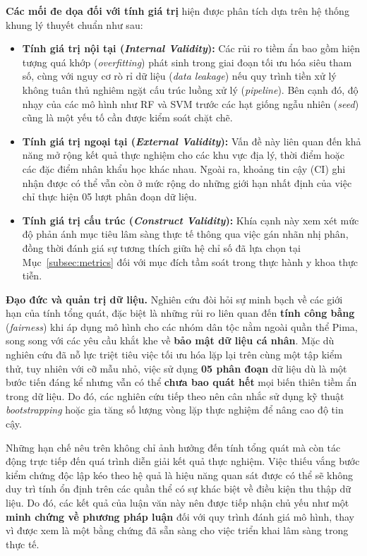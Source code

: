 \documentclass[14pt,a4paper]{extreport}
\begin{document}
\textbf{Các mối đe dọa đối với tính giá trị} hiện được phân tích dựa trên hệ thống khung lý thuyết chuẩn như sau:

\begin{itemize}
  \item \textbf{Tính giá trị nội tại (\textit{Internal Validity}):} Các rủi ro tiềm ẩn bao gồm hiện tượng quá khớp (\textit{overfitting}) phát sinh trong giai đoạn tối ưu hóa siêu tham số, cùng với nguy cơ rò rỉ dữ liệu (\textit{data leakage}) nếu quy trình tiền xử lý không tuân thủ nghiêm ngặt cấu trúc luồng xử lý (\textit{pipeline}). Bên cạnh đó, độ nhạy của các mô hình như RF và SVM trước các hạt giống ngẫu nhiên (\textit{seed}) cũng là một yếu tố cần được kiểm soát chặt chẽ.
  \item \textbf{Tính giá trị ngoại tại (\textit{External Validity}):} Vấn đề này liên quan đến khả năng mở rộng kết quả thực nghiệm cho các khu vực địa lý, thời điểm hoặc các đặc điểm nhân khẩu học khác nhau. Ngoài ra, khoảng tin cậy (CI) ghi nhận được có thể vẫn còn ở mức rộng do những giới hạn nhất định của việc chỉ thực hiện 05 lượt phân đoạn dữ liệu.
  \item \textbf{Tính giá trị cấu trúc (\textit{Construct Validity}):} Khía cạnh này xem xét mức độ phản ánh mục tiêu lâm sàng thực tế thông qua việc gán nhãn nhị phân, đồng thời đánh giá sự tương thích giữa hệ chỉ số đã lựa chọn tại Mục~\ref{subsec:metrics} đối với mục đích tầm soát trong thực hành y khoa thực tiễn.
\end{itemize}

\noindent\textbf{Đạo đức và quản trị dữ liệu.} Nghiên cứu đòi hỏi sự minh bạch về các giới hạn của tính tổng quát, đặc biệt là những rủi ro liên quan đến \textbf{tính công bằng} (\textit{fairness}) khi áp dụng mô hình cho các nhóm dân tộc nằm ngoài quần thể Pima, song song với các yêu cầu khắt khe về \textbf{bảo mật dữ liệu cá nhân}. Mặc dù nghiên cứu đã nỗ lực triệt tiêu việc tối ưu hóa lặp lại trên cùng một tập kiểm thử, tuy nhiên với cỡ mẫu nhỏ, việc sử dụng \textbf{05 phân đoạn} dữ liệu dù là một bước tiến đáng kể nhưng vẫn có thể \textbf{chưa bao quát hết} mọi biến thiên tiềm ẩn trong dữ liệu. Do đó, các nghiên cứu tiếp theo nên cân nhắc sử dụng kỹ thuật \textit{bootstrapping} hoặc gia tăng số lượng vòng lặp thực nghiệm để nâng cao độ tin cậy.

Những hạn chế nêu trên không chỉ ảnh hưởng đến tính tổng quát mà còn tác động trực tiếp đến quá trình diễn giải kết quả thực nghiệm. Việc thiếu vắng bước kiểm chứng độc lập kéo theo hệ quả là hiệu năng quan sát được có thể sẽ không duy trì tính ổn định trên các quần thể có sự khác biệt về điều kiện thu thập dữ liệu. Do đó, các kết quả của luận văn này nên được tiếp nhận chủ yếu như một \textbf{minh chứng về phương pháp luận} đối với quy trình đánh giá mô hình, thay vì được xem là một bằng chứng đã sẵn sàng cho việc triển khai lâm sàng trong thực tế.
\end{document}
